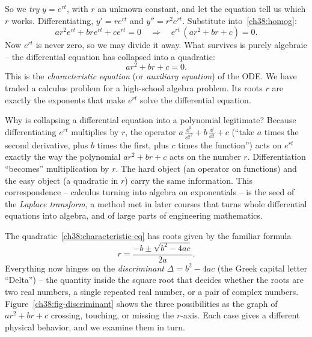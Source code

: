 So we \emph{try} $y = e^{rt}$, with $r$ an unknown constant, and let the equation
tell us which $r$ works. Differentiating, $y' = r e^{rt}$ and $y'' = r^2 e^{rt}$.
Substitute into~\eqref{ch38:homog}:
\[
  a r^2 e^{rt} + b r e^{rt} + c e^{rt} = 0
  \quad\Longrightarrow\quad
  e^{rt}\,(a r^2 + b r + c) = 0.
\]
Now $e^{rt}$ is never zero, so we may divide it away. What survives is purely
algebraic -- the differential equation has collapsed into a quadratic:
\begin{equation}
  \boxed{\,a r^2 + b r + c = 0.\,}
  \label{ch38:characteristic-eq}
\end{equation}
This is the \emph{characteristic equation} (or \emph{auxiliary equation}) of the
ODE. We have traded a calculus problem for a high-school algebra problem. Its
roots $r$ are exactly the exponents that make $e^{rt}$ solve the differential
equation.

\begin{whybox}
Why is collapsing a differential equation into a polynomial legitimate? Because
differentiating $e^{rt}$ multiplies by $r$, the operator
$a\,\frac{\dd^2}{\dd t^2} + b\,\frac{\dd}{\dd t} + c$ (``take $a$ times the second
derivative, plus $b$ times the first, plus $c$ times the function'') acts on
$e^{rt}$ exactly the
way the polynomial $a r^2 + b r + c$ acts on the number $r$. Differentiation
``becomes'' multiplication by $r$. The hard object (an operator on
functions) and the easy object (a quadratic in $r$) carry the same
information. This correspondence -- calculus turning into algebra on
exponentials -- is the seed of the \emph{Laplace transform}, a method met in
later courses that turns whole differential equations into algebra, and of large
parts of engineering mathematics.
\end{whybox}

The quadratic~\eqref{ch38:characteristic-eq} has roots given by the familiar
formula
\[
  r = \frac{-b \pm \sqrt{b^2 - 4ac}}{2a}.
\]
Everything now hinges on the \emph{discriminant} $\Delta = b^2 - 4ac$ (the Greek
capital letter ``Delta'') -- the
quantity inside the square root that decides whether the roots are two real
numbers, a single repeated real number, or a pair of complex numbers.
Figure~\ref{ch38:fig-discriminant} shows the three possibilities as the graph of
$a r^2 + b r + c$ crossing, touching, or missing the $r$-axis. Each case
gives a different physical behavior, and we examine them in turn.

